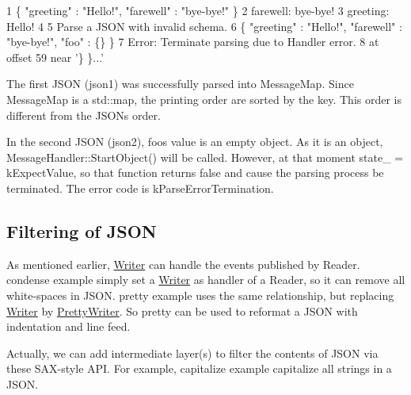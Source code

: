 \begin{DoxyCode}
1 \{ "greeting" : "Hello!", "farewell" : "bye-bye!" \}
2 farewell: bye-bye!
3 greeting: Hello!
4 
5 Parse a JSON with invalid schema.
6 \{ "greeting" : "Hello!", "farewell" : "bye-bye!", "foo" : \{\} \}
7 Error: Terminate parsing due to Handler error.
8  at offset 59 near '\} \}...'
\end{DoxyCode}


The first J\+S\+ON ({\ttfamily json1}) was successfully parsed into {\ttfamily Message\+Map}. Since {\ttfamily Message\+Map} is a {\ttfamily std\+::map}, the printing order are sorted by the key. This order is different from the J\+S\+ON\textquotesingle{}s order.

In the second J\+S\+ON ({\ttfamily json2}), {\ttfamily foo}\textquotesingle{}s value is an empty object. As it is an object, {\ttfamily Message\+Handler\+::\+Start\+Object()} will be called. However, at that moment {\ttfamily state\+\_\+ = k\+Expect\+Value}, so that function returns {\ttfamily false} and cause the parsing process be terminated. The error code is {\ttfamily k\+Parse\+Error\+Termination}.\hypertarget{md_Cadriciel_Commun_Externe_RapidJSON_doc_sax.zh-cn_Filtering}{}\subsection{Filtering of J\+S\+ON}\label{md_Cadriciel_Commun_Externe_RapidJSON_doc_sax.zh-cn_Filtering}
As mentioned earlier, {\ttfamily \hyperlink{class_writer}{Writer}} can handle the events published by {\ttfamily Reader}. {\ttfamily condense} example simply set a {\ttfamily \hyperlink{class_writer}{Writer}} as handler of a {\ttfamily Reader}, so it can remove all white-\/spaces in J\+S\+ON. {\ttfamily pretty} example uses the same relationship, but replacing {\ttfamily \hyperlink{class_writer}{Writer}} by {\ttfamily \hyperlink{class_pretty_writer}{Pretty\+Writer}}. So {\ttfamily pretty} can be used to reformat a J\+S\+ON with indentation and line feed.

Actually, we can add intermediate layer(s) to filter the contents of J\+S\+ON via these S\+A\+X-\/style A\+PI. For example, {\ttfamily capitalize} example capitalize all strings in a J\+S\+ON.


